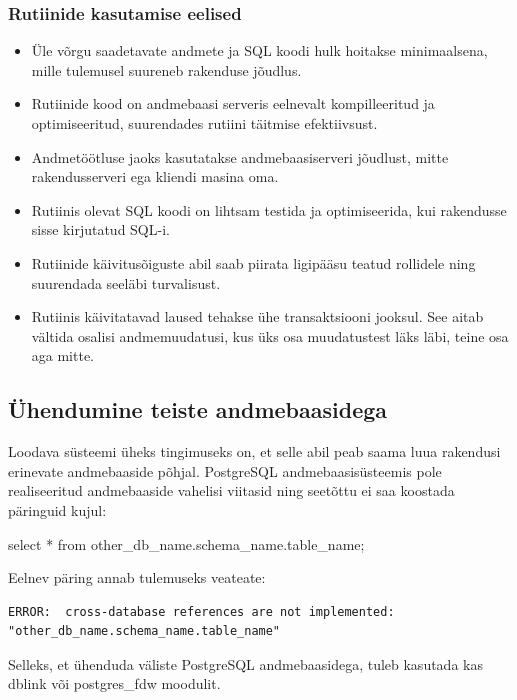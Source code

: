 \documentclass[a4paper,12pt]{article} %
\begin{document}
\subsubsection{Rutiinide kasutamise eelised}
\begin{itemize}
\item Üle võrgu saadetavate andmete ja SQL koodi hulk hoitakse minimaalsena, mille tulemusel suureneb rakenduse jõudlus.
\item Rutiinide kood on andmebaasi serveris eelnevalt kompilleeritud ja optimiseeritud, suurendades rutiini täitmise efektiivsust.
\item Andmetöötluse jaoks kasutatakse andmebaasiserveri jõudlust, mitte rakendusserveri ega kliendi masina oma.
\item Rutiinis olevat SQL koodi on lihtsam testida ja optimiseerida, kui rakendusse sisse kirjutatud SQL-i.
\item Rutiinide käivitusõiguste abil saab piirata ligipääsu teatud rollidele ning suurendada seeläbi turvalisust.
\item Rutiinis käivitatavad laused tehakse ühe transaktsiooni jooksul. See aitab vältida osalisi andmemuudatusi, kus üks osa muudatustest läks läbi, teine osa aga mitte.
\end{itemize}
\cite[lk 179, 195]{BuildingTheAgileDatabase}

\subsection{Ühendumine teiste andmebaasidega}
Loodava süsteemi üheks tingimuseks on, et selle abil peab saama luua rakendusi erinevate andmebaaside põhjal. PostgreSQL andmebaasisüsteemis pole realiseeritud andmebaaside vahelisi viitasid ning seetõttu ei saa koostada päringuid kujul:
\begin{SQL}
select * from other_db_name.schema_name.table_name;
\end{SQL}
Eelnev päring annab tulemuseks veateate:
\begin{lstlisting}
ERROR:  cross-database references are not implemented: "other_db_name.schema_name.table_name"
\end{lstlisting}
Selleks, et ühenduda väliste PostgreSQL andmebaasidega, tuleb kasutada kas dblink või postgres\_fdw moodulit.
\end{document}
